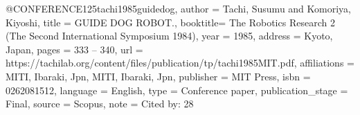 @CONFERENCE{125tachi1985guidedog,
author = {Tachi, Susumu and Komoriya, Kiyoshi},
title = {GUIDE DOG ROBOT.},
booktitle= {The Robotics Research 2 (The Second International Symposium 1984)},
year = {1985},
address = {Kyoto, Japan},
pages = {333 – 340},
url = {https://tachilab.org/content/files/publication/tp/tachi1985MIT.pdf},
affiliations = {MITI, Ibaraki, Jpn, MITI, Ibaraki, Jpn},
publisher = {MIT Press},
isbn = {0262081512},
language = {English},
type = {Conference paper},
publication_stage = {Final},
source = {Scopus},
note = {Cited by: 28}
}